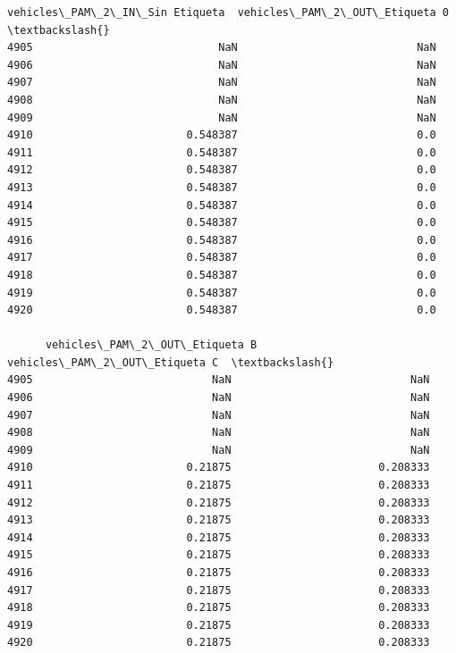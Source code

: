 \documentclass[11pt]{article}
\begin{document}
\begin{tcolorbox}[breakable, size=fbox, boxrule=.5pt, pad at break*=1mm, opacityfill=0]
\begin{Verbatim}[commandchars=\\\{\}]
      vehicles\_PAM\_2\_IN\_Sin Etiqueta  vehicles\_PAM\_2\_OUT\_Etiqueta 0  \textbackslash{}
4905                             NaN                            NaN
4906                             NaN                            NaN
4907                             NaN                            NaN
4908                             NaN                            NaN
4909                             NaN                            NaN
4910                        0.548387                            0.0
4911                        0.548387                            0.0
4912                        0.548387                            0.0
4913                        0.548387                            0.0
4914                        0.548387                            0.0
4915                        0.548387                            0.0
4916                        0.548387                            0.0
4917                        0.548387                            0.0
4918                        0.548387                            0.0
4919                        0.548387                            0.0
4920                        0.548387                            0.0

      vehicles\_PAM\_2\_OUT\_Etiqueta B  vehicles\_PAM\_2\_OUT\_Etiqueta C  \textbackslash{}
4905                            NaN                            NaN
4906                            NaN                            NaN
4907                            NaN                            NaN
4908                            NaN                            NaN
4909                            NaN                            NaN
4910                        0.21875                       0.208333
4911                        0.21875                       0.208333
4912                        0.21875                       0.208333
4913                        0.21875                       0.208333
4914                        0.21875                       0.208333
4915                        0.21875                       0.208333
4916                        0.21875                       0.208333
4917                        0.21875                       0.208333
4918                        0.21875                       0.208333
4919                        0.21875                       0.208333
4920                        0.21875                       0.208333


\end{Verbatim}
\end{tcolorbox}
\end{document}
